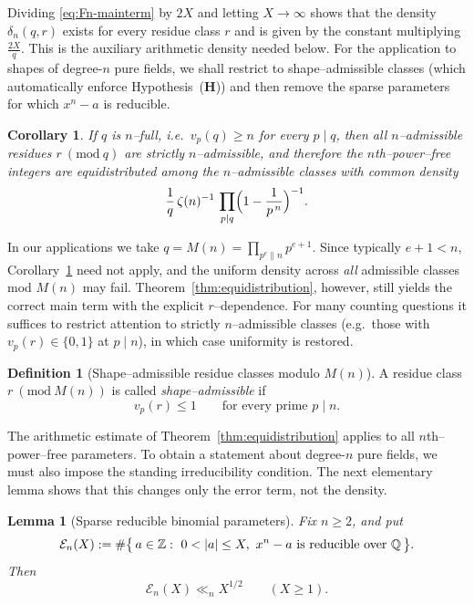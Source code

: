\documentclass[12pt,a4paper,oneside]{amsart}
\newtheorem{lemma}[theorem]{Lemma}
\newtheorem{corollary}[theorem]{Corollary}
\theoremstyle{definition}
\newtheorem{definition}[theorem]{Definition}
\begin{document}
Dividing \eqref{eq:Fn-mainterm} by $2X$ and letting $X\to\infty$ shows that the density $\delta_n(q,r)$ exists for every residue class $r$ and is given by the constant multiplying $\frac{2X}{q}$. This is the auxiliary arithmetic density needed below. For the application to shapes of degree-$n$ pure fields, we shall restrict to shape--admissible classes (which automatically enforce Hypothesis~\textup{(\textbf{H})}) and then remove the sparse parameters for which $x^n-a$ is reducible.

\begin{corollary}\label{cor:nfull}
If $q$ is \emph{$n$–full}, i.e.\ $v_p(q)\ge n$ for every $p\mid q$, then all $n$–admissible residues $r\ (\mathrm{mod}\ q)$ are strictly $n$–admissible, and therefore the $n$th–power–free integers are equidistributed among the $n$–admissible classes with common density
\[
\frac{1}{q}\,\zeta(n)^{-1}\,\prod_{p\mid q}\Bigl(1-\frac1{p^{\,n}}\Bigr)^{-1}.
\]
\end{corollary}

In our applications we take $q=M(n)=\prod_{p^e\parallel n}p^{e+1}$. Since typically $e+1<n$, Corollary~\ref{cor:nfull} need not apply, and the uniform density across \emph{all} admissible classes mod $M(n)$ may fail. Theorem~\ref{thm:equidistribution}, however, still yields the correct main term with the explicit $r$–dependence. For many counting questions it suffices to restrict attention to strictly $n$–admissible classes (e.g.\ those with $v_p(r)\in\{0,1\}$ at $p\mid n$), in which case uniformity is restored.

\begin{definition}[Shape--admissible residue classes modulo $M(n)$]\label{def:shape-admissible}
A residue class $r\ (\mathrm{mod}\ M(n))$ is called \emph{shape--admissible} if
\[
v_p(r)\le 1\qquad\text{for every prime }p\mid n.
\]
\end{definition}

The arithmetic estimate of Theorem~\ref{thm:equidistribution} applies to all $n$th--power--free parameters. To obtain a statement about degree-$n$ pure fields, we must also impose the standing irreducibility condition. The next elementary lemma shows that this changes only the error term, not the density.

\begin{lemma}[Sparse reducible binomial parameters]\label{lem:reducible-binomial-parameters}
Fix $n\ge2$, and put
\[
\mathcal E_n(X):=
\#\bigl\{\,a\in\Bbb Z:\ 0<|a|\le X,\ x^n-a\text{ is reducible over }\Bbb Q\,\bigr\}.
\]
Then
\[
\mathcal E_n(X)\ll_n X^{1/2}\qquad(X\ge1).
\]
\end{lemma}
\end{document}
